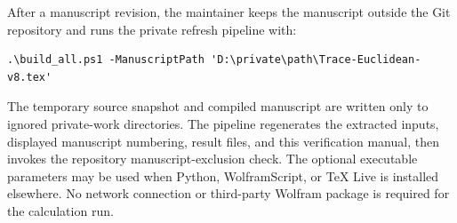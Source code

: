 \documentclass[12pt,a4paper]{amsart}
\theoremstyle{remark}
\theoremstyle{definition}
\begin{document}
After a manuscript revision, the maintainer keeps the manuscript outside the
Git repository and runs the private refresh pipeline with:
\begin{Verbatim}[fontsize=\small,breaklines=true]
.\build_all.ps1 -ManuscriptPath 'D:\private\path\Trace-Euclidean-v8.tex'
\end{Verbatim}
The temporary source snapshot and compiled manuscript are written only to
ignored private-work directories.  The pipeline regenerates the extracted
inputs, displayed manuscript numbering, result files, and this verification
manual, then invokes the repository manuscript-exclusion check.  The optional
executable parameters may be used when Python, WolframScript, or TeX Live is
installed elsewhere.  No network connection or third-party Wolfram package is
required for the calculation run.
\end{document}
